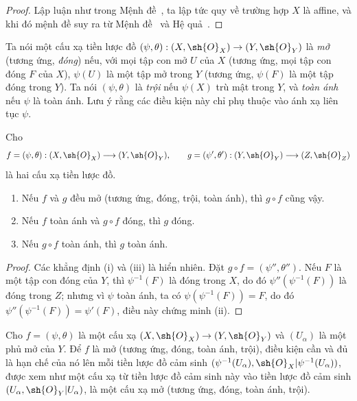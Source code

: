 \documentclass[oneside]{amsart}
\makeatletter
\newcommand{\ega@arrow}[2]{\mathchoice{#1}{#2}{#2}{#2}}
\renewcommand{\to}{\ega@arrow{\longrightarrow}{\rightarrow}}
\let\EGAOriginalLabel\label
\renewcommand{\label}[1]{\phantomsection\EGAOriginalLabel{#1}}
\makeatother
\begin{document}
\begin{proof}
Lập luận như trong Mệnh đề~, ta lập tức quy về trường hợp
$X$ là affine, và khi đó mệnh đề suy ra từ Mệnh đề~
và Hệ quả~.
\end{proof}

\begin{env}[2.2.6]
\label{I.2.2.6}
Ta nói một cấu xạ tiền lược đồ
$(\psi,\theta):(X,\sh{O}_X)\to(Y,\sh{O}_Y)$ là \emph{mở}
(tương ứng, \emph{đóng}) nếu, với mọi tập con mở $U$ của $X$
(tương ứng, mọi tập con đóng $F$ của $X$), $\psi(U)$ là một tập mở trong $Y$
(tương ứng, $\psi(F)$ là một tập đóng trong $Y$).
Ta nói $(\psi,\theta)$ là \emph{trội} nếu $\psi(X)$ trù mật trong $Y$,
và \emph{toàn ánh} nếu $\psi$ là toàn ánh.
Lưu ý rằng các điều kiện này chỉ phụ thuộc vào ánh xạ liên tục $\psi$.
\end{env}

\begin{proposition}[2.2.7]
\label{I.2.2.7}
Cho
\[
  f=(\psi,\theta):(X,\sh{O}_X)\to(Y,\sh{O}_Y),
  \qquad
  g=(\psi',\theta'):(Y,\sh{O}_Y)\to(Z,\sh{O}_Z)
\]
là hai cấu xạ tiền lược đồ.
\begin{enumerate}
  \item[\rm(i)] Nếu $f$ và $g$ đều mở (tương ứng, đóng, trội, toàn ánh),
    thì $g\circ f$ cũng vậy.
  \item[\rm(ii)] Nếu $f$ toàn ánh và $g\circ f$ đóng, thì $g$ đóng.
  \item[\rm(iii)] Nếu $g\circ f$ toàn ánh, thì $g$ toàn ánh.
\end{enumerate}
\end{proposition}

\begin{proof}
Các khẳng định (i) và (iii) là hiển nhiên.
Đặt $g\circ f=(\psi'',\theta'')$.
Nếu $F$ là một tập con đóng của $Y$, thì $\psi^{-1}(F)$ là đóng trong $X$,
do đó $\psi''(\psi^{-1}(F))$ là đóng trong $Z$; nhưng vì $\psi$ toàn ánh,
ta có $\psi(\psi^{-1}(F))=F$, do đó
$\psi''(\psi^{-1}(F))=\psi'(F)$, điều này chứng minh (ii).
\end{proof}

\begin{proposition}[2.2.8]
\label{I.2.2.8}
Cho $f=(\psi,\theta)$ là một cấu xạ
$(X,\sh{O}_X)\to(Y,\sh{O}_Y)$ và $(U_\alpha)$ là một phủ mở của $Y$.
Để $f$ là mở (tương ứng, đóng, toàn ánh, trội), điều kiện cần và đủ là
hạn chế của nó lên mỗi tiền lược đồ cảm sinh
$(\psi^{-1}(U_\alpha),\sh{O}_X|\psi^{-1}(U_\alpha))$, được xem như một cấu xạ
từ tiền lược đồ cảm sinh này vào tiền lược đồ cảm sinh
$(U_\alpha,\sh{O}_Y|U_\alpha)$, là một cấu xạ mở
(tương ứng, đóng, toàn ánh, trội).
\end{proposition}
\end{document}
